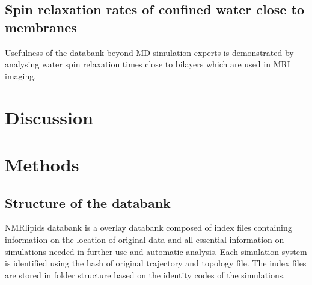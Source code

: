 \documentclass[fleqn,10pt]{wlscirep}
\begin{document}
\subsection{Spin relaxation rates of confined water close to membranes}

Usefulness of the databank beyond MD simulation experts is demonstrated by analysing water spin relaxation times close to bilayers which are used in MRI imaging.



 

\section{Discussion}


\section{Methods}


\subsection{Structure of the databank}

NMRlipids databank is a overlay databank composed of index files containing information on the location of original data and all essential information on simulations needed in further use and automatic analysis. Each simulation system is identified using the hash of original trajectory and topology file. The index files are stored in folder structure based on the identity codes of the simulations.
\end{document}
